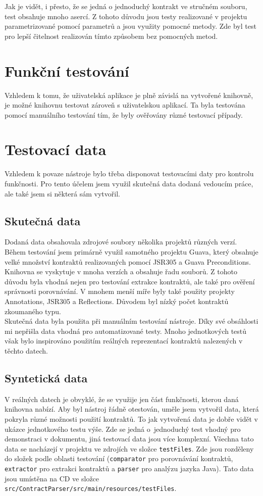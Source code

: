 				Jak je vidět, i přesto, že se jedná o jednoduchý kontrakt ve stručném souboru, test obsahuje mnoho asercí. Z tohoto důvodu jsou testy realizované v projektu parametrizované pomocí parametrů a jsou využity pomocné metody. Zde byl test pro lepší čitelnost realizován tímto způsobem bez pomocných metod.
				
		
	\section{Funkční testování}
		Vzhledem k tomu, že uživatelská aplikace je plně závislá na vytvořené knihovně, je možné knihovnu testovat zároveň s uživatelskou aplikací. Ta byla testována pomocí manuálního testování tím, že byly ověřovány různé testovací případy.
			
	\section{Testovací data}
		Vzhledem k povaze nástroje bylo třeba disponovat testovacími daty pro kontrolu funkčnosti. Pro tento účelem jsem využil skutečná data dodaná vedoucím práce, ale také jsem si některá sám vytvořil.
		
		\subsection{Skutečná data}
			Dodaná data obsahovala zdrojové soubory několika projektů různých verzí. Během testování jsem primárně využil samotného projektu Guava, který obsahuje velké množství kontraktů realizovaných pomocí JSR305 a Guava Preconditions. Knihovna se vyskytuje v mnoha verzích a obsahuje řadu souborů. Z tohoto důvodu byla vhodná nejen pro testování extrakce kontraktů, ale také pro ověření správnosti porovnávání. V mnohem menší míře byly také použity projekty Annotations, JSR305 a Reflections. Důvodem byl nízký počet kontraktů zkoumaného typu.\\
			
			Skutečná data byla použita při manuálním testování nástroje. Díky své obsáhlosti mi nepřišla data vhodná pro automatizované testy. Mnoho jednotkových testů však bylo inspirováno použitím reálných reprezentací kontraktů nalezených v těchto datech.
			
		\subsection{Syntetická data}
			V reálných datech je obvyklé, že se využije jen část funkčnosti, kterou daná knihovna nabízí. Aby byl nástroj řádně otestován, uměle jsem vytvořil data, která pokryla různé možnosti použití kontraktů. To jak vytvořená data je dobře vidět v ukázce jednotkového testu výše. Zde se jedná o~jednoduchý test vhodný pro demonstraci v dokumentu, jiná testovací data jsou více komplexní. Všechna tato data se nacházejí v projektu ve zdrojích ve složce \texttt{testFiles}. Zde jsou rozděleny do složek podle oblasti testování (\texttt{comparator} pro porovnávání kontraktů, \texttt{extractor} pro extrakci kontraktů a \texttt{parser} pro analýzu jazyka Java). Tato data jsou umístěna na CD ve složce \texttt{src/ContractParser/src/main/resources/testFiles}.		 
		 
